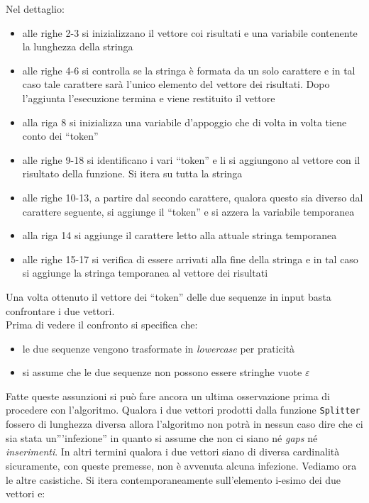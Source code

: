\documentclass[a4paper,12pt, oneside]{book}
\begin{document}
\noindent
Nel dettaglio:
\begin{itemize}
  \item alle righe 2-3 si inizializzano il vettore coi risultati e una variabile
  contenente la lunghezza della stringa
  \item alle righe 4-6 si controlla se la stringa è formata da un solo
  carattere e in tal caso tale carattere sarà l'unico elemento del vettore dei
  risultati. Dopo l'aggiunta l'esecuzione termina e viene restituito il vettore
  \item alla riga 8 si inizializza una variabile d'appoggio che di volta in
  volta tiene conto dei ``token''
  \item alle righe 9-18 si identificano i vari ``token'' e li si aggiungono al
  vettore con il risultato della funzione. Si itera su tutta la
  stringa 
  \item alle righe 10-13, a partire dal secondo carattere, qualora questo
  sia diverso dal carattere seguente, si aggiunge il ``token'' e si azzera la
  variabile temporanea
  \item alla riga 14 si aggiunge il carattere letto alla attuale
  stringa temporanea
  \item alle righe 15-17 si verifica di essere arrivati alla fine
  della stringa e in tal caso si aggiunge la stringa temporanea al vettore dei
  risultati  
\end{itemize}
Una volta ottenuto il vettore dei ``token'' delle due sequenze in input basta
confrontare i due vettori.\\
Prima di vedere il confronto si specifica che:
\begin{itemize}
  \item le due sequenze vengono trasformate in \textit{lowercase} per praticità
  \item si assume che le due sequenze non possono essere stringhe vuote
  $\varepsilon$ 
\end{itemize}
Fatte queste assunzioni si può fare ancora un ultima osservazione prima di
procedere con l'algoritmo. Qualora i due vettori prodotti dalla funzione
\texttt{Splitter} fossero di lunghezza diversa allora l'algoritmo non potrà in
nessun caso dire che ci sia stata un'''infezione'' in quanto si assume che non
ci siano né \textit{gaps} né \textit{inserimenti}. In altri termini qualora i
due vettori siano di diversa cardinalità sicuramente, con queste premesse, non è
avvenuta alcuna infezione. Vediamo ora le altre casistiche. Si itera
contemporaneamente sull'elemento i-esimo dei due vettori e:
\end{document}
